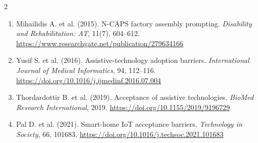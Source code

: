 {\begin{multicols}{2}
\begin{enumerate}[label=\arabic*.,leftmargin=1.4em,itemsep=0pt,parsep=0pt,topsep=0pt]
      \item Mihailidis A. et al. (2015). N-CAPS factory assembly prompting. \emph{Disability and Rehabilitation: AT}, 11(7), 604--612. \url{https://www.researchgate.net/publication/279634166}
      \item Yusif S. et al. (2016). Assistive-technology adoption barriers. \emph{International Journal of Medical Informatics}, 94, 112--116. \url{https://doi.org/10.1016/j.ijmedinf.2016.07.004}
      \item Thordardottir B. et al. (2019). Acceptance of assistive technologies. \emph{BioMed Research International}, 2019. \url{https://doi.org/10.1155/2019/9196729}
      \item Pal D. et al. (2021). Smart-home IoT acceptance barriers. \emph{Technology in Society}, 66, 101683. \url{https://doi.org/10.1016/j.techsoc.2021.101683}
    \end{enumerate}
    \end{multicols}
    }

